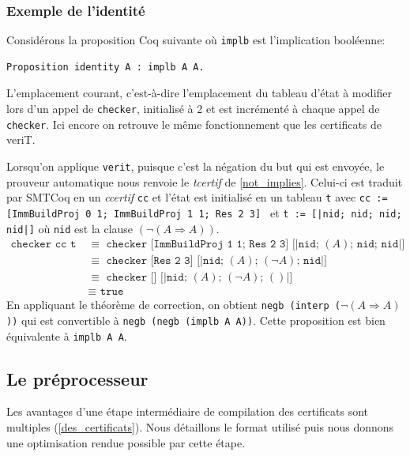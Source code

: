\documentclass[11pt]{article}
\begin{document}
\subsubsection{Exemple de l'identité}

Considérons la proposition Coq suivante où \texttt{implb} est l'implication booléenne:
\begin{lstlisting}[frame=single]
  Proposition identity A : implb A A.
\end{lstlisting}

L'emplacement courant, c'est-à-dire l'emplacement du tableau d'état à modifier lors d'un appel de \texttt{checker}, initialisé à 2 et est incrémenté à chaque appel de \texttt{checker}. Ici encore on retrouve le même fonctionnement que les certificats de veriT. \medbreak

Lorsqu'on applique \texttt{verit}, puisque c'est la négation du but qui est envoyée, le prouveur automatique nous renvoie le \textit{tcertif} de \ref{not_implies}. Celui-ci est traduit par SMTCoq en un \textit{ccertif} \texttt{cc} et l'état est initialisé en un tableau \texttt{t} avec \texttt{cc := [ImmBuildProj 0 1; ImmBuildProj 1 1; Res 2 3] } et \texttt{t := [|nid; nid; nid; nid|]} où \texttt{nid} est la clause $(\neg (A \Rightarrow A))$.
\begin{align*}
  \texttt{checker cc t}\,\, &\equiv \,\, \texttt{checker [ImmBuildProj 1 1; Res 2 3] [|nid; }(A)\texttt{; nid; nid|]} \\
    &\equiv \,\, \texttt{checker [Res 2 3] [|nid; }(A)\texttt{; }(\neg A)\texttt{; nid|]} \\
    &\equiv \,\, \texttt{checker [] [|nid; }(A)\texttt{; }(\neg A)\texttt{; }()\texttt{|]} \\
    &\equiv \,\, \texttt{true}
\end{align*}
En appliquant le théorème de correction, on obtient \texttt{negb (interp (}$\neg (A \Rightarrow A)$\texttt{))} qui est convertible à \texttt{negb (negb (implb A A))}. Cette proposition est bien équivalente à \texttt{implb A A}.

\subsection{Le préprocesseur}

Les avantages d'une étape intermédiaire de compilation des certificats sont multiples (\ref{des_certificats}). Nous détaillons le format utilisé puis nous donnons une optimisation rendue possible par cette étape.
\end{document}
